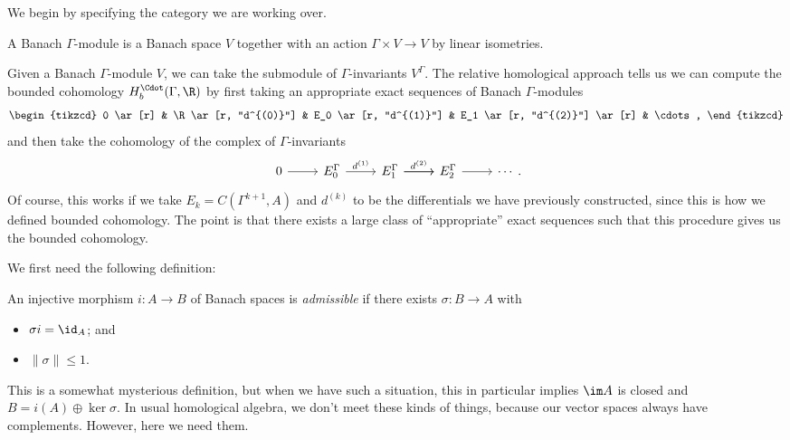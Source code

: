 \documentclass[a4paper]{article}
\begin{document}
We begin by specifying the category we are working over.
\begin{defi}
  A Banach $\Gamma$-module is a Banach space $V$ together with an action $\Gamma \times V \to V$ by linear isometries.
\end{defi}
Given a Banach $\Gamma$-module $V$, we can take the submodule of $\Gamma$-invariants $V^\Gamma$. The relative homological approach tells us we can compute the bounded cohomology $H_b^\Cdot(\Gamma, \R)$ by first taking an appropriate exact sequences of Banach $\Gamma$-modules
\[
  \begin{tikzcd}
    0 \ar[r] & \R \ar[r, "d^{(0)}"] & E_0 \ar[r, "d^{(1)}"] & E_1 \ar[r, "d^{(2)}"] \ar[r] & \cdots,
  \end{tikzcd}
\]
and then take the cohomology of the complex of $\Gamma$-invariants
\[
  \begin{tikzcd}
    0 \ar[r] & E_0^\Gamma \ar[r, "d^{(1)}"] & E_1^\Gamma \ar[r, "d^{(2)}"] \ar[r] & E_2^\Gamma \ar[r] & \cdots
  \end{tikzcd}.
\]
Of course, this works if we take $E_k = C(\Gamma^{k + 1}, A)$ and $d^{(k)}$ to be the differentials we have previously constructed, since this is how we defined bounded cohomology. The point is that there exists a large class of ``appropriate'' exact sequences such that this procedure gives us the bounded cohomology.

We first need the following definition:
\begin{defi}
  An injective morphism $i: A \to B$ of Banach spaces is \emph{admissible} if there exists $\sigma: B \to A$ with
  \begin{itemize}
    \item $\sigma i = \id_A$; and
    \item $\|\sigma\|\leq 1$.
  \end{itemize}
\end{defi}
This is a somewhat mysterious definition, but when we have such a situation, this in particular implies $\im A$ is closed and $B = i(A) \oplus \ker \sigma$. In usual homological algebra, we don't meet these kinds of things, because our vector spaces always have complements. However, here we need them.
\end{document}
